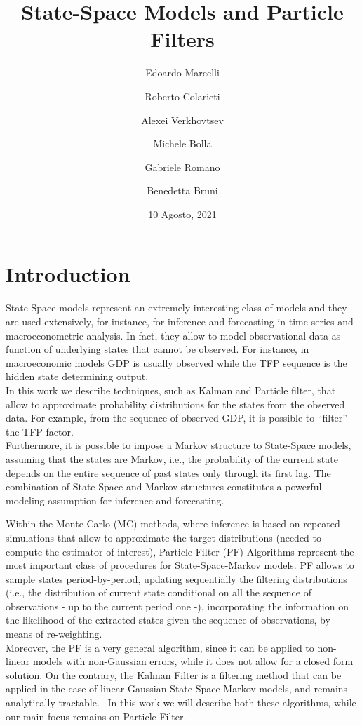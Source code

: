 \documentclass[
]{book}
\title{\Huge State-Space Models and Particle Filters}
\author{Edoardo Marcelli \and Roberto Colarieti \and Alexei Verkhovtsev \and Michele Bolla \and Gabriele Romano \and Benedetta Bruni}
\date{10 Agosto, 2021}
\theoremstyle{break}
\theoremstyle{nonumberplain}
\begin{document}
\frontmatter
\maketitle

\mainmatter
\tableofcontents

\chapter*{Introduction}

State-Space models represent an extremely interesting class of models
and they are used extensively, for instance, for inference and
forecasting in time-series and macroeconometric analysis. In fact, they
allow to model observational data as function of underlying states that
cannot be observed. For instance, in macroeconomic models GDP is usually
observed while the TFP sequence is the hidden state determining
output.\\
In this work we describe techniques, such as Kalman and Particle filter,
that allow to approximate probability distributions for the states from
the observed data. For example, from the sequence of observed GDP, it is
possible to ``filter'' the TFP factor.\\
Furthermore, it is possible to impose a Markov structure to State-Space
models, assuming that the states are Markov, i.e., the probability of
the current state depends on the entire sequence of past states only
through its first lag. The combination of State-Space and Markov
structures constitutes a powerful modeling assumption for inference and
forecasting. ~

Within the Monte Carlo (MC) methods, where inference is based on
repeated simulations that allow to approximate the target distributions
(needed to compute the estimator of interest), Particle Filter (PF)
Algorithms represent the most important class of procedures for
State-Space-Markov models. PF allows to sample states period-by-period,
updating sequentially the filtering distributions (i.e., the
distribution of current state conditional on all the sequence of
observations - up to the current period one -), incorporating the
information on the likelihood of the extracted states given the sequence
of observations, by means of re-weighting.\\
Moreover, the PF is a very general algorithm, since it can be applied to
non-linear models with non-Gaussian errors, while it does not allow for
a closed form solution. On the contrary, the Kalman Filter is a
filtering method that can be applied in the case of linear-Gaussian
State-Space-Markov models, and remains analytically tractable.~ In this
work we will describe both these algorithms, while our main focus
remains on Particle Filter. ~
\end{document}
